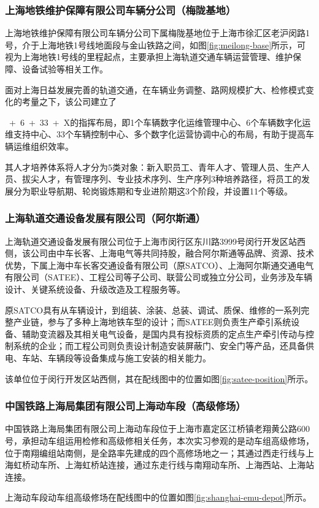 \subsubsection{上海地铁维护保障有限公司车辆分公司（梅陇基地）}
\noindent
\begin{minipage}[t]{0.48\textwidth}
  \vspace{-3mm}
  \qquad{}上海地铁维护保障有限公司车辆分公司下属梅陇基地位于上海市徐汇区老沪闵路1号，介于上海地铁1号线地面段与金山铁路之间，如图\ref{fig:meilong-base}所示，可视为上海地铁1号线的里程起点，主要承担上海轨道交通车辆运营管理、维护保障、设备试验等相关工作。\par{}
  \qquad{}面对上海日益发展完善的轨道交通，在车辆业务调整、路网规模扩大、检修模式变化的考量之下，该公司建立了\par{}
\end{minipage}
\hfill
\begin{minipage}[t]{0.48\textwidth}
\end{minipage}
\par\medskip{}~+~6~+~33~+~X的指挥布局，即1个车辆数字化运维管理中心、6个车辆数字化运维支持中心、33个车辆控制中心、多个数字化运营协调中心的布局，有助于提高车辆运维组织效率。\par{}
其人才培养体系将人才分为5类对象：新入职员工、青年人才、管理人员、生产人员、拔尖人才，有管理序列、专业技术序列、生产序列3种培养路径，将员工的发展分为职业导航期、轮岗锻炼期和专业进阶期这3个阶段，并设置11个等级。

\subsubsection{上海轨道交通设备发展有限公司（阿尔斯通）}
上海轨道交通设备发展有限公司位于上海市闵行区东川路3999号闵行开发区站西侧，该公司由中车长客、上海电气等共同持股，融合阿尔斯通等品牌、资源、技术优势，下属上海中车长客交通设备有限公司（原SATCO）、上海阿尔斯通交通电气有限公司（SATEE）、工程公司等子公司、联营公司或独立分公司，业务涉及车辆设计、关键系统设备、升级改造及工程服务等。\par{}
原SATCO具有从车辆设计，到组装、涂装、总装、调试、质保、维修的一系列完整产业链，参与了多种上海地铁车型的设计；而SATEE则负责生产牵引系统设备、辅助变流器及其相关电气设备，是国内具有投标资质的定点生产牵引传动与控制系统的企业；而工程公司则负责设计制造安装屏蔽门、安全门等产品，还具备供电、车站、车辆段等设备集成与施工安装的相关能力。\par{}
该单位位于闵行开发区站西侧，其在配线图中的位置如图\ref{fig:satee-position}所示。\par{}

\subsubsection{中国铁路上海局集团有限公司上海动车段（高级修场）}
中国铁路上海局集团有限公司上海动车段位于上海市嘉定区江桥镇老翔黄公路600号，承担动车组运用检修和高级修相关任务，本次实习参观的是动车组高级修场，位于南翔编组站南侧，是全路率先建成的四个高修场地之一；其通过西走行线与上海虹桥动车所、上海虹桥站连接，通过东走行线与南翔动车所、上海西站、上海站连接。\par{}
上海动车段动车组高级修场在配线图中的位置如图\ref{fig:shanghai-emu-depot}所示。\par{}


